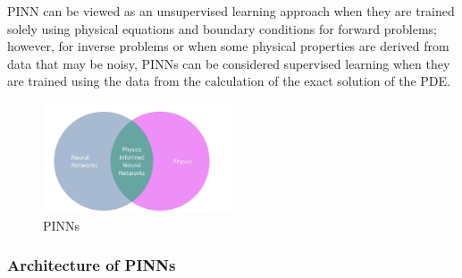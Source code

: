 \documentclass{article}
\begin{document}
PINN can be viewed as an unsupervised learning approach when they are trained solely using physical equations and boundary conditions for forward problems; however, for inverse problems or when some physical properties are derived from data that may be noisy, PINNs can be considered supervised learning when they are trained using the data from the calculation of the exact solution of the PDE.
\begin{figure}[H]
    \centering
    \includegraphics[width=0.5\textwidth]{images/pinns}
    \caption{PINNs}
\end{figure}


\subsubsection{Architecture of PINNs}


\end{document}

